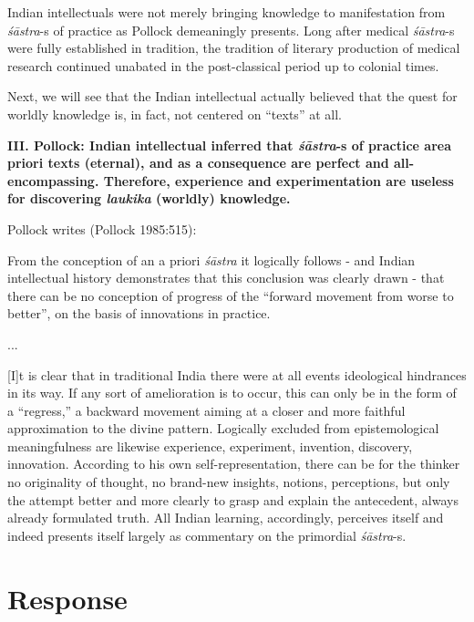 Indian intellectuals were not merely bringing knowledge to manifestation from {\sl śāstra}-s of practice as Pollock demeaningly presents.  Long after medical {\sl śāstra}-s were fully established in tradition, the tradition of literary production of medical research continued unabated in the post-classical period up to colonial times.

Next, we will see that the Indian intellectual actually believed that the quest for worldly knowledge is, in fact, not centered on ``texts'' at all.

{\bf III. Pollock: Indian intellectual inferred that {{\sl\bfseries śāstra}\relax}-s of practice area priori texts (eternal), and as a consequence are perfect and all-encompassing.  Therefore, experience and experimentation are useless for discovering {{\sl\bfseries laukika}\relax} (worldly) knowledge.}

Pollock writes (Pollock 1985:515):
\begin{myquote}
From the conception of an a priori {\sl śāstra} it logically follows - and Indian intellectual history demonstrates that this conclusion was clearly drawn - that there can be no conception of progress of the ``forward movement from worse to better'', on the basis of innovations in practice.

...

\newpage

[I]t is clear that in traditional India there were at all events ideological hindrances in its way. If any sort of amelioration is to occur, this can only be in the form of a ``regress,'' a backward movement aiming at a closer and more faithful approximation to the divine pattern. Logically excluded from epistemological meaningfulness are likewise experience, experiment, invention, discovery, innovation.  According to his own self-representation, there can be for the thinker no originality of thought, no brand-new insights, notions, perceptions, but only the attempt better and more clearly to grasp and explain the antecedent, always already formulated truth. All Indian learning, accordingly, perceives itself and indeed presents itself largely as commentary on the primordial {\sl śāstra}-s.
\end{myquote}

\section*{Response}

